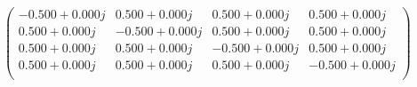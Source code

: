 \documentclass[border=1em]{standalone}
\begin{document}
$
\left(
\begin{array}{cccc}
-0.500+0.000j & 0.500+0.000j & 0.500+0.000j & 0.500+0.000j \\
0.500+0.000j & -0.500+0.000j & 0.500+0.000j & 0.500+0.000j \\
0.500+0.000j & 0.500+0.000j & -0.500+0.000j & 0.500+0.000j \\
0.500+0.000j & 0.500+0.000j & 0.500+0.000j & -0.500+0.000j \\
\end{array}
\right)
$
\end{document}

